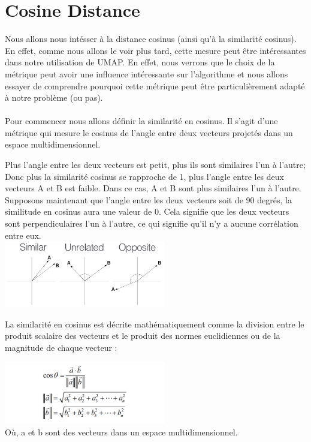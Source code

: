 \section*{Cosine Distance}
Nous allons nous intésser à la distance cosinus (ainsi  qu'à la similarité cosinus). En effet, comme nous allons le  voir plus tard, cette mesure peut être intéressantes dans notre utilisation de UMAP. En effet, nous verrons que le choix de la métrique peut avoir une influence intéressante sur l'algorithme et nous allons essayer de comprendre pourquoi cette métrique peut être particulièrement adapté à notre problème (ou pas).
\\
\\
Pour commencer nous allons définir la similarité en cosinus. Il s'agit d'une métrique qui mesure le cosinus de l'angle entre deux vecteurs projetés dans un espace multidimensionnel.


Plus l'angle entre les deux vecteurs est petit, plus ils sont similaires l'un à l'autre; Donc plus la similarité cosinus se rapproche de 1, plus l'angle entre les deux vecteurs A et B est faible. Dans ce cas, A et B sont plus similaires l'un à l'autre.
\\
Supposons maintenant que l'angle entre les deux vecteurs soit de 90 degrés, la similitude en cosinus aura une valeur de 0. Cela signifie que les deux vecteurs sont perpendiculaires l'un à l'autre, ce qui signifie qu'il n'y a aucune corrélation entre eux.
\\
\includegraphics[width=200pt]{./img/notions_math/metric/img_metric_cos.png}


La similarité en cosinus est décrite mathématiquement comme la division entre le produit scalaire des vecteurs et le produit des normes euclidiennes ou de la magnitude de chaque vecteur :


\includegraphics[width=200pt]{./img/notions_math/metric/eq_metric_cos.png}
\\
Où, a et b sont des vecteurs dans un espace multidimensionnel.


